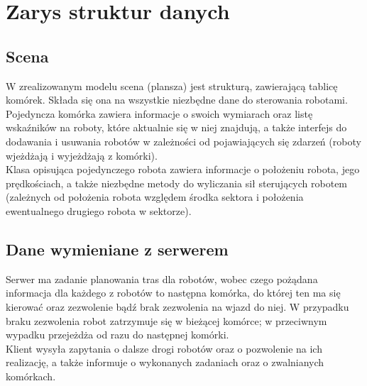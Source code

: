 
\section{Zarys struktur danych}

\subsection{Scena}

W zrealizowanym modelu scena (plansza) jest strukturą, zawierającą tablicę komórek. Składa się ona na wszystkie 
niezbędne dane do sterowania robotami.\\

Pojedyncza komórka zawiera informacje o swoich wymiarach oraz listę wskaźników na roboty, które aktualnie się w niej znajdują, a także interfejs do dodawania i usuwania robotów w zależności od pojawiających się zdarzeń (roboty wjeżdżają i wyjeżdżają z komórki).\\

Klasa opisująca pojedynczego robota zawiera informacje o położeniu robota, jego prędkościach, a także niezbędne metody do wyliczania sił sterujących robotem (zależnych od położenia robota względem środka sektora i położenia ewentualnego drugiego robota w sektorze).

\subsection{Dane wymieniane z serwerem}

Serwer ma zadanie planowania tras dla robotów, wobec czego pożądana informacja dla każdego z robotów to następna komórka, do której ten ma się kierować oraz zezwolenie bądź brak zezwolenia na wjazd do niej. W przypadku braku zezwolenia robot zatrzymuje się w bieżącej komórce; w przeciwnym wypadku przejeżdża od razu do następnej komórki.\\

Klient wysyła zapytania o dalsze drogi robotów oraz o pozwolenie na ich realizację, a także informuje o wykonanych zadaniach oraz o zwalnianych komórkach.
